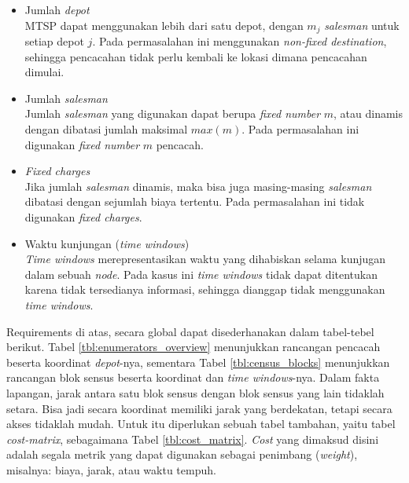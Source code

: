 \begin{itemize}
\item Jumlah \textit{depot} \\
MTSP dapat menggunakan lebih dari satu depot, dengan $ m_{j} $ \textit{salesman} untuk setiap depot $ j $. Pada permasalahan ini menggunakan \textit{non-fixed destination}, sehingga pencacahan tidak perlu kembali ke lokasi dimana pencacahan dimulai.
\item Jumlah \textit{salesman} \\
Jumlah \textit{salesman} yang digunakan dapat berupa \textit{fixed number} $ m $, atau dinamis dengan dibatasi jumlah maksimal $ max(m) $. Pada permasalahan ini digunakan \textit{fixed number} $ m $ pencacah.
\item \textit{Fixed charges} \\
Jika jumlah \textit{salesman} dinamis, maka bisa juga masing-masing \textit{salesman} dibatasi dengan sejumlah biaya tertentu. Pada permasalahan ini tidak digunakan \textit{fixed charges}.
\item Waktu kunjungan (\textit{time windows}) \\
\textit{Time windows} merepresentasikan waktu yang dihabiskan selama kunjugan dalam sebuah \textit{node}. Pada kasus ini \textit{time windows} tidak dapat ditentukan karena tidak tersedianya informasi, sehingga dianggap tidak menggunakan \textit{time windows}.
\end{itemize}


Requirements di atas, secara global dapat disederhanakan dalam tabel-tebel berikut. Tabel \ref{tbl:enumerators_overview} menunjukkan rancangan pencacah beserta koordinat \textit{depot}-nya, sementara Tabel \ref{tbl:census_blocks} menunjukkan rancangan blok sensus beserta koordinat dan \textit{time windows}-nya. Dalam fakta lapangan, jarak antara satu blok sensus dengan blok sensus yang lain tidaklah setara. Bisa jadi secara koordinat memiliki jarak yang berdekatan, tetapi secara akses tidaklah mudah. Untuk itu diperlukan sebuah tabel tambahan, yaitu tabel \textit{cost-matrix}, sebagaimana Tabel \ref{tbl:cost_matrix}. \textit{Cost} yang dimaksud disini adalah segala metrik yang dapat digunakan sebagai penimbang (\textit{weight}), misalnya: biaya, jarak, atau waktu tempuh.


